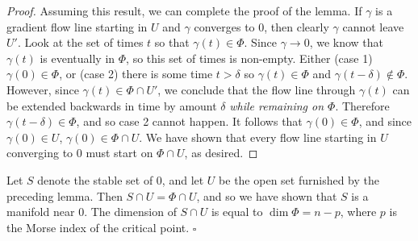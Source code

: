 \documentclass{amsart}
\begin{document}
\begin{proof}
  Assuming this result, we can complete the proof of the lemma. If $\gamma$ is a gradient flow line starting in $U$ and $\gamma$ converges to $0$, then clearly $\gamma$ cannot leave $U'$. Look at the set of times $t$ so that $\gamma(t)\in \Phi$. Since $\gamma\to 0$, we know that $\gamma(t)$ is eventually in $\Phi$, so this set of times is non-empty. Either (case 1) $\gamma(0)\in \Phi$, or (case 2) there is some time $t>\delta$ so $\gamma(t)\in \Phi$ and $\gamma(t-\delta)\not\in \Phi$. However, since $\gamma(t)\in \Phi\cap U'$, we conclude that the flow line through $\gamma(t)$ can be extended backwards in time by amount $\delta$ \emph{while remaining on $\Phi$}. Therefore $\gamma(t-\delta)\in \Phi$, and so case 2 cannot happen. It follows that $\gamma(0)\in \Phi$, and since $\gamma(0)\in U$, $\gamma(0)\in \Phi\cap U$. We have shown that every flow line starting in $U$ converging to $0$ must start on $\Phi\cap U$, as desired.
\end{proof}
\begin{cor}
  Let $S$ denote the stable set of $0$, and let $U$ be the open set furnished by the preceding lemma. Then $S\cap U=\Phi\cap U$, and so we have shown that $S$ is a manifold near $0$. The dimension of $S\cap U$ is equal to $\dim \Phi=n-p$, where $p$ is the Morse index of the critical point. \hfill $\square$
\end{cor}
\end{document}
